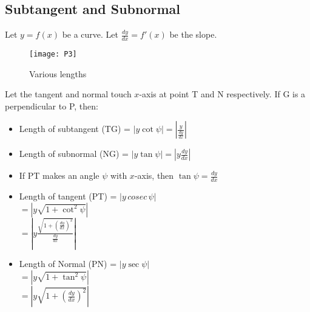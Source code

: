 \documentclass[11pt,a4paper,landscape]{article}
\begin{document}
\begin{multicols*}{2}
\section{Subtangent and Subnormal}
	Let $y=f(x)$ be a curve. Let $\frac{dy}{dx}=f'(x)$ be the slope.
	\begin{figure}[H]
		\centering
		\texttt{[image: P3]}
		\caption{Various lengths}
	\end{figure}	
	Let the tangent and normal touch $x$-axis at point T and N respectively. If G is a perpendicular to P, then:
	\begin{itemize}
	\item Length of subtangent (TG) = $|y\cot\psi| = \left|\frac{y}{\frac{dy}{dx}}\right|$
	\item Length of subnormal (NG) = $|y\tan\psi| = \left|y\frac{dy}{dx}\right|$
	\item If PT makes an angle $\psi$ with $x$-axis, then $\tan\psi = \frac{dy}{dx}$
	\item Length of tangent (PT) = $|y\,cosec\,\psi|$\\[2mm]
	$= |y\sqrt{1+\cot^2{\psi}}|$\\[3mm]
	$= \left|y\frac{\sqrt{1+\left(\frac{dy}{dx}\right)^2}}{\frac{dy}{dx}}\right|$
	\item Length of Normal (PN) = $|y\sec{\psi}|$\\[2mm]
	$= |y\sqrt{1+\tan^2{\psi}}|$\\[3mm]
	$= \left|y\sqrt{1+\left(\frac{dy}{dx}\right)^2}\right|$
	\end{itemize}
\end{multicols*}
\end{document}
